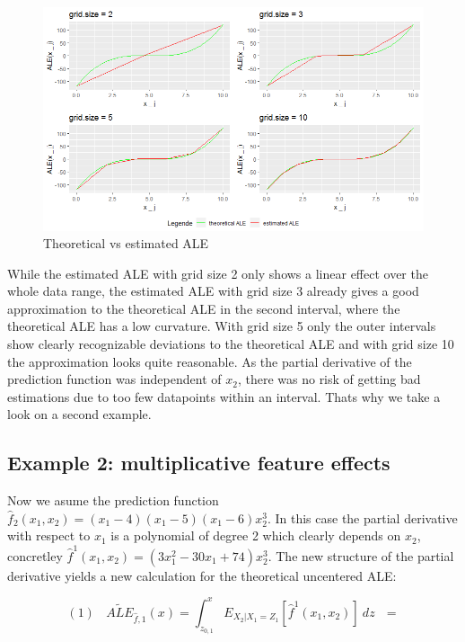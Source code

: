 \documentclass[
]{krantz}
\begin{document}
\begin{figure}
\includegraphics[width=1\linewidth]{images/ALE_2_example1_} \caption{Theoretical vs estimated ALE}\label{fig:exampleALE1}
\end{figure}



While the estimated ALE with grid size 2 only shows a linear effect over the whole data range, the estimated ALE with grid size 3 already gives a good approximation to the theoretical ALE in the second interval, where the theoretical ALE has a low curvature. With grid size 5 only the outer intervals show clearly recognizable deviations to the theoretical ALE and with grid size 10 the approximation looks quite reasonable.
As the partial derivative of the prediction function was independent of \(x_2\), there was no risk of getting bad estimations due to too few datapoints within an interval. Thats why we take a look on a second example.

\hypertarget{example-2-multiplicative-feature-effects}{%
\subsection{Example 2: multiplicative feature effects}\label{example-2-multiplicative-feature-effects}}

Now we asume the prediction function \(\hat{f}_2 (x_1, x_2) = (x_1-4)(x_1-5)(x_1-6)x_2^3\). In this case the partial derivative with respect to \(x_1\) is a polynomial of degree 2 which clearly depends on \(x_2\), concretley \(\hat{f}^1(x_1,x_2) = (3x_1^2 -30x_1 +74)x_2^3\). The new structure of the partial derivative yields a new calculation for the theoretical uncentered ALE:

\[(1)~~~~\widetilde{ALE}_{\hat{f},1}(x) = \int_{z_{0,1}}^x E_{X_2\vert X_1= Z_1}[\hat{f}^1(x_1,x_2)]~dz~~~=\]
\end{document}
